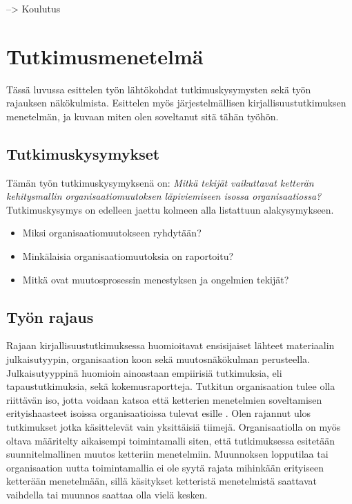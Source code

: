 --> Koulutus


\section{Tutkimusmenetelmä}
\label{sec:menetelma}

Tässä luvussa esittelen työn lähtökohdat tutkimuskysymysten sekä työn rajauksen
näkökulmista. Esittelen myös järjestelmällisen kirjallisuustutkimuksen
menetelmän, ja kuvaan miten olen soveltanut sitä tähän työhön.

\subsection{Tutkimuskysymykset}

Tämän työn tutkimuskysymyksenä on: \textit{Mitkä tekijät vaikuttavat ketterän
kehitysmallin organisaatiomuutoksen läpiviemiseen isossa organisaatiossa?}
Tutkimuskysymys on edelleen jaettu kolmeen alla listattuun alakysymykseen.

\begin{itemize}
\item Miksi organisaatiomuutokseen ryhdytään?
\item Minkälaisia organisaatiomuutoksia on raportoitu?
\item Mitkä ovat muutosprosessin menestyksen ja ongelmien tekijät?
\end{itemize}

\subsection{Työn rajaus}

Rajaan kirjallisuustutkimuksessa huomioitavat ensisijaiset lähteet materiaalin
julkaisutyypin, organisaation koon sekä muutosnäkökulman perusteella.
Julkaisutyyppinä huomioin ainoastaan empiirisiä tutkimuksia, eli
tapaustutkimuksia, sekä kokemusraportteja. Tutkitun organisaation tulee olla
riittävän iso, jotta voidaan katsoa että ketterien menetelmien soveltamisen
erityishaasteet isoissa organisaatioissa tulevat esille \citep{Lindvall2004}.
Olen rajannut ulos tutkimukset jotka käsittelevät vain yksittäisiä tiimejä.
Organisaatiolla on myös oltava määritelty aikaisempi toimintamalli siten, että
tutkimuksessa esitetään suunnitelmallinen muutos ketteriin menetelmiin.
Muunnoksen lopputilaa tai organisaation uutta toimintamallia ei ole syytä rajata
mihinkään erityiseen ketterään menetelmään, sillä käsitykset ketteristä
menetelmistä saattavat vaihdella tai muunnos saattaa olla vielä kesken.

